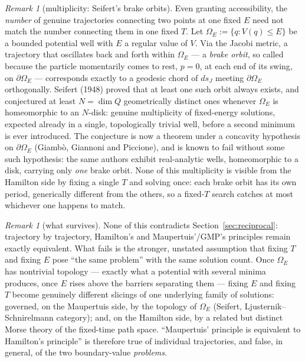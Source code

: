 \documentclass[11pt]{book}
\theoremstyle{definition}
\theoremstyle{plain}
\theoremstyle{remark}
\newtheorem{remark}[definition]{Remark}
\begin{document}
\begin{remark}[multiplicity: Seifert's brake orbits]
Even granting accessibility, the \emph{number} of genuine trajectories connecting two points at one fixed $E$ need not match the number connecting them in one fixed $T$. Let $\Omega_E:=\{q:V(q)\le E\}$ be a bounded potential well with $E$ a regular value of $V$. Via the Jacobi metric, a trajectory that oscillates back and forth within $\Omega_E$ --- a \emph{brake orbit}, so called because the particle momentarily comes to rest, $p=0$, at each end of its swing, on $\partial\Omega_E$ --- corresponds exactly to a geodesic chord of $ds_J$ meeting $\partial\Omega_E$ orthogonally. Seifert (1948) proved that at least one such orbit always exists, and conjectured at least $N=\dim Q$ geometrically distinct ones whenever $\Omega_E$ is homeomorphic to an $N$-disk: genuine multiplicity of fixed-energy solutions, expected already in a single, topologically trivial well, before a second minimum is ever introduced. The conjecture is now a theorem under a concavity hypothesis on $\partial\Omega_E$ (Giambò, Giannoni and Piccione), and is known to fail without some such hypothesis: the same authors exhibit real-analytic wells, homeomorphic to a disk, carrying only \emph{one} brake orbit. None of this multiplicity is visible from the Hamilton side by fixing a single $T$ and solving once: each brake orbit has its own period, generically different from the others, so a fixed-$T$ search catches at most whichever one happens to match.
\end{remark}

\begin{remark}[what survives]
None of this contradicts Section~\ref{sec:reciprocal}: trajectory by trajectory, Hamilton's and Maupertuis'/GMP's principles remain exactly equivalent. What fails is the stronger, unstated assumption that fixing $T$ and fixing $E$ pose ``the same problem'' with the same solution count. Once $\Omega_E$ has nontrivial topology --- exactly what a potential with several minima produces, once $E$ rises above the barriers separating them --- fixing $E$ and fixing $T$ become genuinely different slicings of one underlying family of solutions: governed, on the Maupertuis side, by the topology of $\Omega_E$ (Seifert, Ljusternik--Schnirelmann category); and, on the Hamilton side, by a related but distinct Morse theory of the fixed-time path space. ``Maupertuis' principle is equivalent to Hamilton's principle'' is therefore true of individual trajectories, and false, in general, of the two boundary-value \emph{problems}.
\end{remark}
\end{document}

